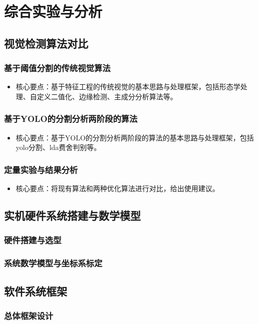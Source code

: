 \documentclass{Diploma}
\begin{document}
\chapter{综合实验与分析}
\section{视觉检测算法对比}
\subsection{基于阈值分割的传统视觉算法}
\begin{itemize}
  \item 核心要点：基于特征工程的传统视觉的基本思路与处理框架，包括形态学处理、自定义二值化、边缘检测、主成分分析算法等。
\end{itemize}
\subsection{基于YOLO的分割分析两阶段的算法}
\begin{itemize}
  \item 核心要点：基于YOLO的分割分析两阶段的算法的基本思路与处理框架，包括yolo分割、lda费舍判别等。
\end{itemize}
\subsection{定量实验与结果分析}
\begin{itemize}
  \item 核心要点：将现有算法和两种优化算法进行对比，给出使用建议。
\end{itemize}
\section{实机硬件系统搭建与数学模型}
\subsection{硬件搭建与选型}
\subsection{系统数学模型与坐标系标定}
\section{软件系统框架}
\subsection{总体框架设计}
\end{document}
